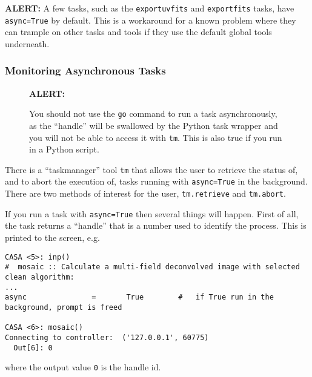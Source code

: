 {\bf ALERT:} A few tasks, such as the {\tt exportuvfits} and
{\tt exportfits} tasks, have {\tt async=True} by default.  This
is a workaround for a known problem where they can trample on other
tasks and tools if they use the default global tools underneath.

\subsubsection{Monitoring Asynchronous Tasks}
\label{section:intro.tasks.async.tm}


\begin{wrapfigure}{r}{2.5in}
  \begin{boxedminipage}{2.5in}
     \centerline{\bf ALERT:}
     You should not use the {\tt go} command to run a task
     asynchronously, as the ``handle'' will be swallowed by
     the Python task wrapper and you will not be able to
     access it with {\tt tm}.  This is also true if you run
     in a Python script.
  \end{boxedminipage}
\end{wrapfigure}

There is a ``taskmanager'' tool {\tt tm} that allows the user
to retrieve the status of, and to abort the execution of, tasks
running with {\tt async=True} in the background.  There
are two methods of interest for the user, {\tt tm.retrieve} and
{\tt tm.abort}.

If you run a task with {\tt async=True} then several things will
happen.  First of all, the task returns a ``handle'' that is 
a number used to identify the process.  This is printed to the 
screen, e.g. 
\small
\begin{verbatim}
CASA <5>: inp()
#  mosaic :: Calculate a multi-field deconvolved image with selected clean algorithm:
...
async               =       True        #   if True run in the background, prompt is freed

CASA <6>: mosaic()
Connecting to controller:  ('127.0.0.1', 60775)
  Out[6]: 0
\end{verbatim}
\normalsize
where the output value {\tt 0} is the handle id.  

